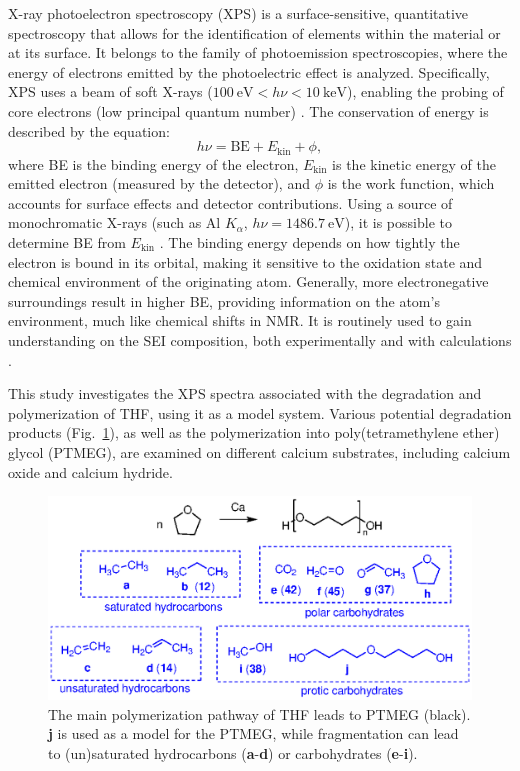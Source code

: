 \documentclass[journal=jpccck,manuscript=article]{achemso}
\begin{document}
X-ray photoelectron spectroscopy (XPS) is a surface-sensitive, quantitative spectroscopy that allows for the identification of elements within the material or at its surface. It belongs to the family of photoemission spectroscopies, where the energy of electrons emitted by the photoelectric effect is analyzed. Specifically, XPS uses a beam of soft X-rays ($\SI{100}{\electronvolt} < h\nu < \SI{10}{\kilo\electronvolt}$), enabling the probing of core electrons (low principal quantum number) \cite{stevieIntroductionXrayPhotoelectron2020}. The conservation of energy is described by the equation:
\begin{equation}
	h\nu = \text{BE} + E_{\text{kin}} + \phi, \label{eq:xps}
\end{equation}
where BE is the binding energy of the electron, $E_{\text{kin}}$ is the kinetic energy of the emitted electron (measured by the detector), and $\phi$ is the work function, which accounts for surface effects and detector contributions. Using a source of monochromatic X-rays (such as Al $K_\alpha$, $h\nu = \SI{1486.7}{\electronvolt}$), it is possible to determine BE from $E_{\text{kin}}$ \cite{vinesPredictionCoreLevel2018}. The binding energy depends on how tightly the electron is bound in its orbital, making it sensitive to the oxidation state and chemical environment of the originating atom. Generally, more electronegative surroundings result in higher BE, providing information on the atom's environment, much like chemical shifts in NMR. It is routinely used to gain understanding on the SEI composition, both experimentally \cite{melemedImpactDifferentialCa22023} and with calculations \cite{ebadiInsightsLiMetalOrganic2019}.  

This study investigates the XPS spectra associated with the degradation and polymerization of THF, using it as a model system. Various potential degradation products (Fig.~\ref{fig:THFdegradation}), as well as the polymerization into poly(tetramethylene ether) glycol (PTMEG), are examined on different calcium substrates, including calcium oxide and calcium hydride.


\begin{figure}
	\centering
	\includegraphics{Figure1}
	\caption{The main polymerization pathway of THF leads to PTMEG (black). \textbf{j} is used as a model for the PTMEG, while fragmentation can lead to (un)saturated hydrocarbons (\textbf{a}-\textbf{d}) or carbohydrates (\textbf{e}-\textbf{i}).}
	\label{fig:THFdegradation}
\end{figure}
\end{document}
